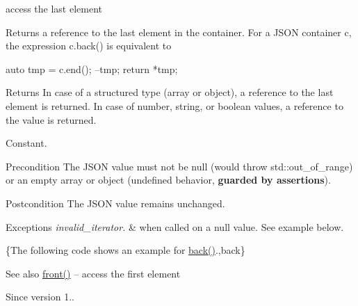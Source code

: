 access the last element 

Returns a reference to the last element in the container. For a J\+S\+ON container {\ttfamily c}, the expression {\ttfamily c.\+back()} is equivalent to 
\begin{DoxyCode}
\textcolor{keyword}{auto} tmp = c.end();
--tmp;
\textcolor{keywordflow}{return} *tmp;
\end{DoxyCode}


\begin{DoxyReturn}{Returns}
In case of a structured type (array or object), a reference to the last element is returned. In case of number, string, or boolean values, a reference to the value is returned.
\end{DoxyReturn}
Constant.

\begin{DoxyPrecond}{Precondition}
The J\+S\+ON value must not be {\ttfamily null} (would throw {\ttfamily std\+::out\+\_\+of\+\_\+range}) or an empty array or object (undefined behavior, {\bfseries guarded by assertions}). 
\end{DoxyPrecond}
\begin{DoxyPostcond}{Postcondition}
The J\+S\+ON value remains unchanged.
\end{DoxyPostcond}

\begin{DoxyExceptions}{Exceptions}
{\em invalid\+\_\+iterator.} & when called on a {\ttfamily null} value. See example below.\\
\hline
\end{DoxyExceptions}
\{The following code shows an example for {\ttfamily \mbox{\hyperlink{classnlohmann_1_1basic__json_a011397134847f36db0ed7d7a93753677}{back()}}}.,back\}

\begin{DoxySeeAlso}{See also}
\mbox{\hyperlink{classnlohmann_1_1basic__json_a3acba9c6ceb7214e565fe08c3ba5b352}{front()}} -- access the first element
\end{DoxySeeAlso}
\begin{DoxySince}{Since}
version 1.. 
\end{DoxySince}
\mbox{\label{classnlohmann_1_1basic__json_a0ff28dac23f2bdecee9564d07f51dcdc}} 

